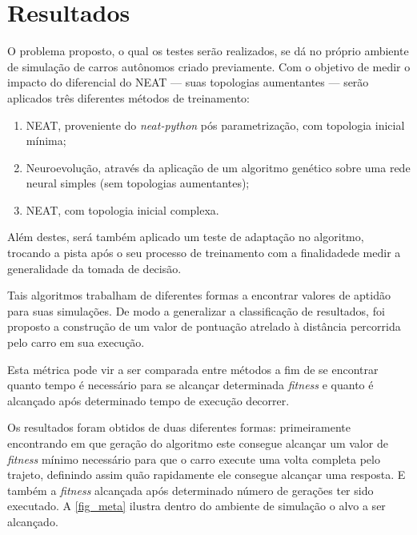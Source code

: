 \chapter{Resultados}

O problema proposto, o qual os testes serão realizados, se dá no próprio
ambiente de simulação de carros autônomos criado previamente. Com o objetivo de
medir o impacto do diferencial do NEAT — suas topologias aumentantes — serão
aplicados tr{\^e}s diferentes m{\'e}todos de treinamento:

\begin{enumerate}
	\item NEAT, proveniente do \textit{neat-python} pós parametrização, com topologia inicial m{\'i}nima;
	\item Neuroevolução, através da aplicação de um algoritmo genético sobre uma rede neural simples (sem topologias aumentantes);
	\item NEAT, com topologia inicial complexa.
\end{enumerate}

Além destes, ser{\'a} tamb{\'e}m aplicado um teste de adapta{\c c}{\~a}o no
algoritmo, trocando a pista após o seu processo de treinamento com a finalidadede medir a
generalidade da tomada de decis{\~a}o.

Tais algoritmos trabalham de diferentes formas a encontrar valores de aptidão
para suas simulações. De modo a generalizar a classificação de resultados, foi
proposto a construção de um valor de pontua{\c c}{\~a}o atrelado à distância percorrida pelo
carro em sua execução.

Esta métrica pode vir a ser comparada entre métodos a fim de se encontrar
quanto tempo é necessário para se alcançar determinada \textit{fitness} e quanto é
alcançado após determinado tempo de execução decorrer.

Os resultados foram obtidos de duas diferentes formas: primeiramente
encontrando em que geração do algoritmo este consegue alcançar um valor de
\textit{fitness} mínimo necessário para que o carro execute uma volta completa pelo
trajeto, definindo assim quão rapidamente ele consegue alcançar uma resposta. 
E também a \textit{fitness} alcançada após determinado número de gerações ter sido executado. A
\autoref{fig_meta} ilustra dentro do ambiente de simulação o alvo a ser alcançado.

